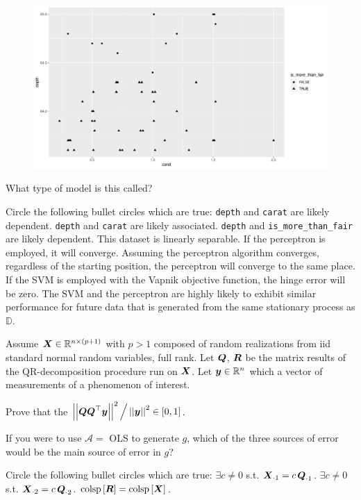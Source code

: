 \documentclass[12pt]{article}
\begin{document}
\begin{figure}[htp]
\centering
\includegraphics[width=7.0in]{more_than_fair}
\end{figure}

 What type of model is this called? 

Circle the following bullet circles which are true:
 \texttt{depth} and \texttt{carat} are likely dependent.
 \texttt{depth} and \texttt{carat} are likely associated.
 \texttt{depth} and \texttt{is\_more\_than\_fair} are likely dependent.
 This dataset is linearly separable.
 If the perceptron is employed, it will converge.  
 Assuming the perceptron algorithm converges, regardless of the starting position, the perceptron will converge to the same place.  
 If the SVM is employed with the Vapnik objective function, the hinge error will be zero.
 The SVM and the perceptron are highly likely to exhibit similar performance for future data that is generated from the same stationary process as $\mathbb{D}$.


\eenum


\problem Assume $\boldsymbol{X} \in \mathbb{R}^{n \times (p+1)}$ with $p >1$ composed of random realizations from iid standard normal random variables, full rank. Let $\boldsymbol{Q}$, $\boldsymbol{R}$ be the matrix results of the QR-decomposition procedure run on $\boldsymbol{X}$. Let $\boldsymbol{y} \in \mathbb{R}^n$ which a vector of measurements of a phenomenon of interest.  %

\benum
{} Prove that the $\left|\left|\boldsymbol{Q}\boldsymbol{Q}^\top\boldsymbol{y}\right|\right|^2 \Big/ \left|\left|\boldsymbol{y}\right|\right|^2 \in \left[0,1\right]$.  


 If you were to use $\mathcal{A} =$ OLS to generate $g$, which of the three sources of error would be the main source of error in $g$?  

Circle the following bullet circles which are true:
 $\exists c \neq 0$ s.t. $\boldsymbol{X}_{\cdot 1} = c\,\boldsymbol{Q}_{\cdot 1}$. 
 $\exists c \neq 0$ s.t. $\boldsymbol{X}_{\cdot 2} = c\,\boldsymbol{Q}_{\cdot 2}$. 
 $\text{colsp}\left[\boldsymbol{R}\right] =\text{colsp}\left[\boldsymbol{X}\right]$. 
\eenum
\end{document}

